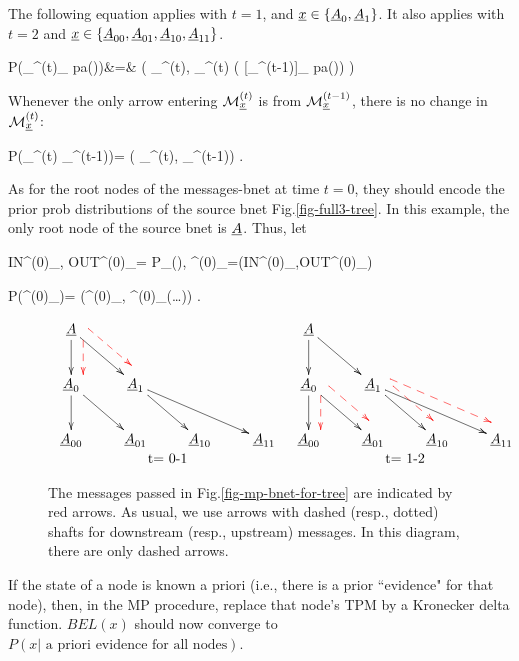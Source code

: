 The following equation
applies with  $t=1$,
and ${\underline{x}}\in\{{\underline{A}}_0, {\underline{A}}_1\}$.
It also applies with
 $t=2$ and ${\underline{x}}\in\{
 {\underline{A}}_{00},{\underline{A}}_{01},
{\underline{A}}_{10},{\underline{A}}_{11}\}$.

\beqa\color{blue}
P(\calm_{\rvx}^{(t)}_
{\rva\in pa(\rvx)\cup \rvx})&=&\color{blue}
\delta(
\calm_{\rvx}^{(t)},
\calm_{\rvx}^{(t)}
( 
[\calm_{\rva}^{(t-1)}]_
{\rva\in pa(\rvx)\cup   \rvx})
)
\eeqa

Whenever the only arrow
entering ${\cal M}_{{\underline{x}}}^{(t)}$
is from ${\cal M}_{{\underline{x}}}^{(t-1)}$,
there is no change in ${\cal M}_{{\underline{x}}}^{(t)}$:

\beq\color{blue}
P(\calm_{\rvx}^{(t)}\cond
\calm_{\rvx}^{(t-1)})=
\delta(
\calm_{\rvx}^{(t)},
\calm_{\rvx}^{(t-1)})
\;.
\eeq

As for the root nodes
of the messages-bnet  at time $t=0$,
they should encode the prior
prob  distributions
of the source bnet Fig.\ref{fig-full3-tree}.
In this example, the only root node 
of the source bnet is ${\underline{A}}$. Thus, let

\beq
IN^{(0)}_,\;\;
OUT^{(0)}_\rvA= P_\rvA(\cdot),\;\;
\calm^{(0)}_\rvA=(IN^{(0)}_\rvA,OUT^{(0)}_\rvA)
\eeq

\beq\color{blue}
P(\calm^{(0)}_\rvA)=
\delta(\calm^{(0)}_\rvA,
\calm^{(0)}_\rvA(\ldots))
\;.
\eeq


\begin{figure}[h!]
\centering
$$
\begin{array}{cc}
\xymatrix{
\rvA\ar[d]\ar[dr]
\ar@[red]@{-->}@<2ex>[d]
\ar@[red]@{-->}@<2ex>[dr]
\\
\rvA_{0}\ar[d]\ar[dr]
&\rvA_{1}\ar[dr]\ar[drr]
\\
\rvA_{00}
&\rvA_{01}
&\rvA_{10}
&\rvA_{11}
}
&
\xymatrix{
\rvA\ar[d]\ar[dr]
\\
\rvA_{0}\ar[d]\ar[dr]
\ar@[red]@{-->}@<2ex>[d]
\ar@[red]@{-->}@<2ex>[dr]
&\rvA_{1}\ar[dr]\ar[drr]
\ar@[red]@{-->}@<2ex>[dr]
\ar@[red]@{-->}@<2ex>[drr]
\\
\rvA_{00}
&\rvA_{01}
&\rvA_{10}
&\rvA_{11}
}
\\
\text{t= 0-1}&\text{t= 1-2}
\end{array}
$$
\caption{
The messages passed in 
Fig.\ref{fig-mp-bnet-for-tree}
are indicated by red arrows.
As usual, we use arrows with
dashed (resp., dotted) shafts for
downstream (resp., upstream) messages. 
In this diagram, there are only
dashed arrows.
}
\label{fig-full3-tree-messages}
\end{figure}

If the state of a node
is known a priori (i.e., 
there is a prior  ``evidence"
for that node),
then,
in the MP procedure,  replace that
node's TPM by
a Kronecker delta function.
$BEL(x)$ should
now  converge to $P(x|\text{ a priori
evidence for
 all nodes})$.

